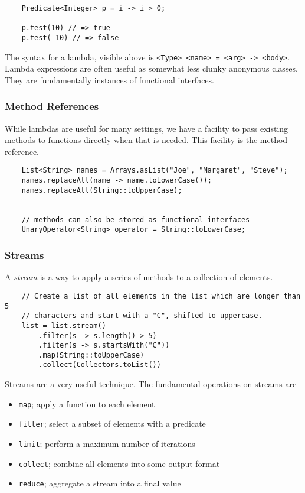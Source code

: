 \documentclass[12pt]{report}
\newcommand{\code}[1]{\lstinline{#1}}
\begin{document}
\begin{flushleft}
\begin{lstlisting}
    Predicate<Integer> p = i -> i > 0;

    p.test(10) // => true
    p.test(-10) // => false
\end{lstlisting}

The syntax for a lambda, visible above is
\code{<Type> <name> = <arg> -> <body>}. Lambda expressions are often useful as
somewhat less clunky anonymous classes. They are fundamentally instances of 
functional interfaces.

\subsubsection*{Method References}

While lambdas are useful for many settings, we have a facility to pass existing
methods to functions directly when that is needed. This facility is the method
reference.

\begin{lstlisting}
    List<String> names = Arrays.asList("Joe", "Margaret", "Steve");
    names.replaceAll(name -> name.toLowerCase());
    names.replaceAll(String::toUpperCase);


    // methods can also be stored as functional interfaces
    UnaryOperator<String> operator = String::toLowerCase;
\end{lstlisting}

\subsubsection*{Streams}

A \textit{stream} is a way to apply a series of methods to a collection of
elements.

\begin{lstlisting}
    // Create a list of all elements in the list which are longer than 5
    // characters and start with a "C", shifted to uppercase.
    list = list.stream()
        .filter(s -> s.length() > 5)
        .filter(s -> s.startsWith("C"))
        .map(String::toUpperCase)
        .collect(Collectors.toList())
\end{lstlisting}

Streams are a very useful technique. The fundamental operations on streams are

\begin{itemize}
    \item \code{map}; apply a function to each element
    \item \code{filter}; select a subset of elements with a predicate
    \item \code{limit}; perform a maximum number of iterations
    \item \code{collect}; combine all elements into some output format
    \item \code{reduce}; aggregate a stream into a final value
\end{itemize}


\end{flushleft}
\end{document}
